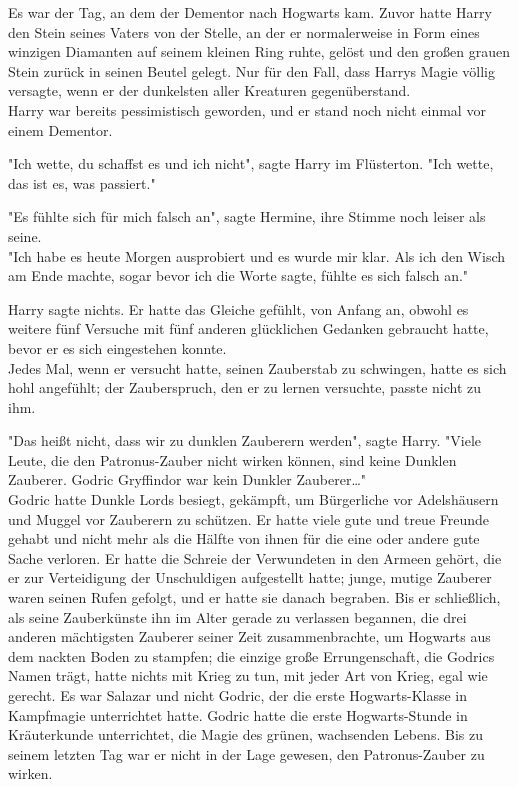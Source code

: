 {Es war der Tag, an dem der Dementor nach Hogwarts kam. Zuvor hatte Harry den Stein seines Vaters von der Stelle, an der er normalerweise in Form eines winzigen Diamanten auf seinem kleinen Ring ruhte, gelöst und den großen grauen Stein zurück in seinen Beutel gelegt. Nur für den Fall, dass Harrys Magie völlig versagte, wenn er der dunkelsten aller Kreaturen gegenüberstand.\\ Harry war bereits pessimistisch geworden, und er stand noch nicht einmal vor einem Dementor.

"Ich wette, du schaffst es und ich nicht", sagte Harry im Flüsterton. "Ich wette, das ist es, was passiert."

"Es fühlte sich für mich falsch an", sagte Hermine, ihre Stimme noch leiser als seine.\\ "Ich habe es heute Morgen ausprobiert und es wurde mir klar. Als ich den Wisch am Ende machte, sogar bevor ich die Worte sagte, fühlte es sich falsch an."

Harry sagte nichts. Er hatte das Gleiche gefühlt, von Anfang an, obwohl es weitere fünf Versuche mit fünf anderen glücklichen Gedanken gebraucht hatte, bevor er es sich eingestehen konnte.\\ Jedes Mal, wenn er versucht hatte, seinen Zauberstab zu schwingen, hatte es sich hohl angefühlt; der Zauberspruch, den er zu lernen versuchte, passte nicht zu ihm.

"Das heißt nicht, dass wir zu dunklen Zauberern werden", sagte Harry. "Viele Leute, die den Patronus-Zauber nicht wirken können, sind keine Dunklen Zauberer. Godric Gryffindor war kein Dunkler Zauberer…"\\ Godric hatte Dunkle Lords besiegt, gekämpft, um Bürgerliche vor Adelshäusern und Muggel vor Zauberern zu schützen. Er hatte viele gute und treue Freunde gehabt und nicht mehr als die Hälfte von ihnen für die eine oder andere gute Sache verloren. Er hatte die Schreie der Verwundeten in den Armeen gehört, die er zur Verteidigung der Unschuldigen aufgestellt hatte; junge, mutige Zauberer waren seinen Rufen gefolgt, und er hatte sie danach begraben. Bis er schließlich, als seine Zauberkünste ihn im Alter gerade zu verlassen begannen, die drei anderen mächtigsten Zauberer seiner Zeit zusammenbrachte, um Hogwarts aus dem nackten Boden zu stampfen; die einzige große Errungenschaft, die Godrics Namen trägt, hatte nichts mit Krieg zu tun, mit jeder Art von Krieg, egal wie gerecht. Es war Salazar und nicht Godric, der die erste Hogwarts-Klasse in Kampfmagie unterrichtet hatte. Godric hatte die erste Hogwarts-Stunde in Kräuterkunde unterrichtet, die Magie des grünen, wachsenden Lebens. Bis zu seinem letzten Tag war er nicht in der Lage gewesen, den Patronus-Zauber zu wirken.

}
